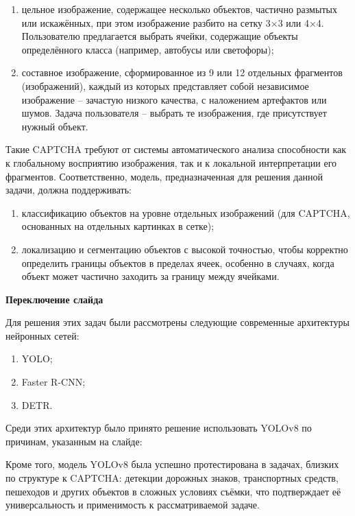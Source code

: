 \documentclass{altsu-report}
\begin{document}
\begin{enumerate}
    \item цельное изображение, содержащее несколько объектов, частично размытых или искажённых, при этом изображение разбито на сетку 3×3 или 4×4. Пользователю предлагается выбрать ячейки, содержащие объекты определённого класса (например, автобусы или светофоры);
    \item составное изображение, сформированное из 9 или 12 отдельных фрагментов (изображений), каждый из которых представляет собой независимое изображение -- зачастую низкого качества, с наложением артефактов или шумов. Задача пользователя -- выбрать те изображения, где присутствует нужный объект.
\end{enumerate}

Такие CAPTCHA требуют от системы автоматического анализа способности как к глобальному восприятию изображения, так и к локальной интерпретации его фрагментов. Соответственно, модель, предназначенная для решения данной задачи, должна поддерживать:

\begin{enumerate}
    \item классификацию объектов на уровне отдельных изображений (для CAPTCHA, основанных на отдельных картинках в сетке);
    \item локализацию и сегментацию объектов с высокой точностью, чтобы корректно определить границы объектов в пределах ячеек, особенно в случаях, когда объект может частично заходить за границу между ячейками.
\end{enumerate}

\textbf{Переключение слайда}

Для решения этих задач были рассмотрены следующие современные архитектуры нейронных сетей:

\begin{enumerate}
    \item YOLO;
    \item Faster R-CNN;
    \item DETR.
\end{enumerate}

Среди этих архитектур было принято решение использовать YOLOv8 по причинам, указанным на слайде:

Кроме того, модель YOLOv8 была успешно протестирована в задачах, близких по структуре к CAPTCHA: детекции дорожных знаков, транспортных средств, пешеходов и других объектов в сложных условиях съёмки, что подтверждает её универсальность и применимость к рассматриваемой задаче.
\end{document}
